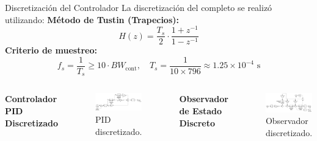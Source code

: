 \documentclass[12pt]{beamer}
\begin{document}
\begin{frame}{Discretización del Controlador}
La discretización del completo se realizó utilizando:
    \textbf{Método de Tustin (Trapecios):}
    \[
    H(z) = \frac{T_s}{2} \cdot \frac{1+z^{-1}}{1-z^{-1}}
    \]
    \textbf{Criterio de muestreo:}
    \[
    f_s = \frac{1}{T_s} \geq 10 \cdot BW_{\text{cont}}, \quad T_s = \frac{1}{10 \times 796} \approx 1.25 \times 10^{-4} \text{ s}
    \]

    \begin{columns}
        \textbf{Controlador PID Discretizado}
        \begin{figure}
            \centering
            \includegraphics[width=\textwidth]{Imagenes/Controlador_PID_discreto.png}
            \caption{PID discretizado.}
            \label{fig:Controlador_PID_discreto}
        \end{figure}

        \textbf{Observador de Estado Discreto}
        \begin{figure}
            \centering
            \includegraphics[width=\textwidth]{Imagenes/Observador_PID_discreto.png}
            \caption{Observador discretizado.}
            \label{fig:observador_estado_discreto}
        \end{figure}
    \end{columns}
\end{frame}
\end{document}
